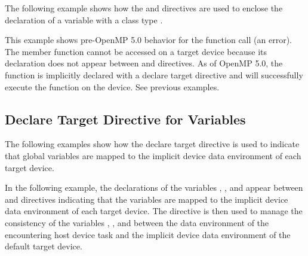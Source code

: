 \begin{cppspecific}

The following example shows how the  and  directives are used to enclose the declaration
of a variable  with a class type . 

This example shows pre-OpenMP 5.0 behavior for the  function call (an error).
The member function  cannot be accessed on a target device because its 
declaration does not appear between  and
 directives. As of OpenMP 5.0, the
function is implicitly declared with a declare target directive 
and will successfully execute the function on the device.  See previous examples.

\end{cppspecific}

\subsection{Declare Target Directive for Variables}
\label{subsec:declare_target_variables}



The following examples show how the declare target directive is used to indicate that
global variables are mapped to the implicit device data environment of each target device.

In the following example, the declarations of the variables , , and  appear 
between  and 
directives indicating that the variables are mapped to the implicit device data 
environment of each target device. The  directive
is then used to manage the consistency of the variables , , and  between the 
data environment of the encountering host device task and the implicit device data 
environment of the default target device.

